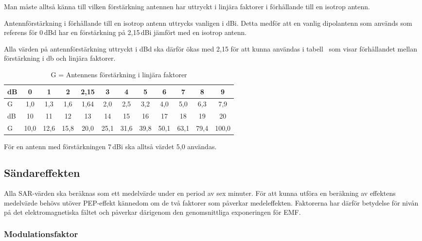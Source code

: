 Man måste alltså känna till vilken förstärkning antennen har uttryckt i linjära
faktorer i förhållande till en isotrop antenn.

Antennförstärkning i förhållande till en isotrop antenn uttrycks vanligen i dBi.
Detta medför att en vanlig dipolantenn som används som referens för 0\,dBd har
en förstärkning på 2,15\,dBi jämfört med en isotrop antenn.

Alla värden på antennförstärkning uttryckt i dBd ska därför ökas med 2,15 för
att kunna användas i tabell~ som visar förhållandet mellan
förstärkning i \unit{\decibel} och linjära faktorer.

\begin{table*}[ht]
  \begin{center}
    \begin{tabular}{|l|ccccccccccc|}
	\hline
	dB     &  0  &  1  &  2 & 2,15 &  3  &  4  &  5  &  6  &  7  &  8  &  9  \\ \hline
	G & 1,0 & 1,3 & 1,6 & 1,64 & 2,0 & 2,5 & 3,2 & 4,0 & 5,0 & 6,3 & 7,9 \\ \hline
	dB     &  10  &  11  &  12  &  13  &  14  &  15  &  16  &  17  &  18  &  19  &  20 \\ \hline
	G & 10,0 & 12,6 & 15,8 & 20,0 & 25,1 & 31,6 & 39,8 & 50,1 & 63,1 & 79,4 & 100,0 \\ \hline
    \end{tabular}
    \caption{G = Antennens förstärkning i linjära faktorer}
    \label{tab:forst}
  \end{center}
\end{table*}

För en antenn med förstärkningen 7\,dBi ska alltså värdet 5,0 användas.


\subsection{Sändareffekten}
Alla SAR-värden ska beräknas som ett medelvärde under en period av sex minuter.
För att kunna utföra en beräkning av effektens medelvärde behövs utöver
PEP-effekt kännedom om de två faktorer som påverkar medeleffekten.
Faktorerna har därför betydelse för nivån på det elektromagnetiska fältet och
påverkar därigenom den genomsnittliga exponeringen för EMF.

\subsubsection{Modulationsfaktor}

